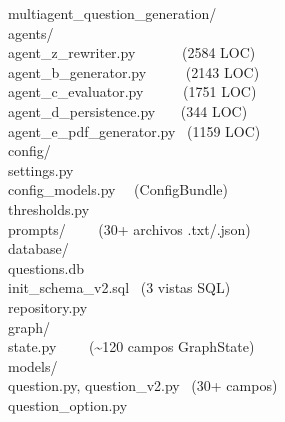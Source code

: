 \documentclass[10pt,twocolumn,letterpaper]{article}
\begin{document}
\begin{tcolorbox}[colback=bglight, colframe=bordercolor, boxrule=0.5pt, arc=2pt]
{\scriptsize\ttfamily
multiagent\_question\_generation/\\
\hspace*{0.5em}agents/\\
\hspace*{1.5em}agent\_z\_rewriter.py ~~~~~~(2584 LOC)\\
\hspace*{1.5em}agent\_b\_generator.py ~~~~~(2143 LOC)\\
\hspace*{1.5em}agent\_c\_evaluator.py ~~~~~(1751 LOC)\\
\hspace*{1.5em}agent\_d\_persistence.py ~~~(344 LOC)\\
\hspace*{1.5em}agent\_e\_pdf\_generator.py ~(1159 LOC)\\
\hspace*{0.5em}config/\\
\hspace*{1.5em}settings.py\\
\hspace*{1.5em}config\_models.py ~~(ConfigBundle)\\
\hspace*{1.5em}thresholds.py\\
\hspace*{1.5em}prompts/ ~~~~(30+ archivos .txt/.json)\\
\hspace*{0.5em}database/\\
\hspace*{1.5em}questions.db\\
\hspace*{1.5em}init\_schema\_v2.sql ~(3 vistas SQL)\\
\hspace*{1.5em}repository.py\\
\hspace*{0.5em}graph/\\
\hspace*{1.5em}state.py ~~~~(\~{}120 campos GraphState)\\
\hspace*{0.5em}models/\\
\hspace*{1.5em}question.py, question\_v2.py ~(30+ campos)\\
\hspace*{1.5em}question\_option.py\\
}
\end{tcolorbox}
\end{document}
